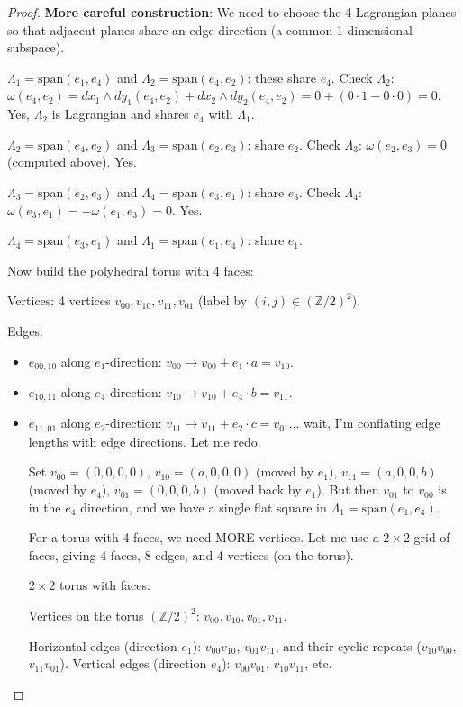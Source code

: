 \documentclass[12pt]{article}
\theoremstyle{definition}
\begin{document}
\begin{proof}
\textbf{More careful construction}: We need to choose the 4 Lagrangian planes so that adjacent planes share an edge direction (a common 1-dimensional subspace).

$\Lambda_1 = \mathrm{span}(e_1, e_4)$ and $\Lambda_2 = \mathrm{span}(e_4, e_2)$: these share $e_4$. Check $\Lambda_2$: $\omega(e_4,e_2) = dx_1\wedge dy_1(e_4,e_2)+dx_2\wedge dy_2(e_4,e_2) = 0+(0\cdot 1-0\cdot 0) = 0$. Yes, $\Lambda_2$ is Lagrangian and shares $e_4$ with $\Lambda_1$.

$\Lambda_2 = \mathrm{span}(e_4, e_2)$ and $\Lambda_3 = \mathrm{span}(e_2, e_3)$: share $e_2$. Check $\Lambda_3$: $\omega(e_2,e_3) = 0$ (computed above). Yes.

$\Lambda_3 = \mathrm{span}(e_2, e_3)$ and $\Lambda_4 = \mathrm{span}(e_3, e_1)$: share $e_3$. Check $\Lambda_4$: $\omega(e_3,e_1) = -\omega(e_1,e_3) = 0$. Yes.

$\Lambda_4 = \mathrm{span}(e_3, e_1)$ and $\Lambda_1 = \mathrm{span}(e_1, e_4)$: share $e_1$.

Now build the polyhedral torus with 4 faces:

Vertices: 4 vertices $v_{00}, v_{10}, v_{11}, v_{01}$ (label by $(i,j)\in(\mathbb{Z}/2)^2$).

Edges:
\begin{itemize}
\item $e_{00,10}$ along $e_1$-direction: $v_{00}\to v_{00}+e_1\cdot a = v_{10}$.
\item $e_{10,11}$ along $e_4$-direction: $v_{10}\to v_{10}+e_4\cdot b = v_{11}$.
\item $e_{11,01}$ along $e_2$-direction: $v_{11}\to v_{11}+e_2\cdot c = v_{01}$... wait, I'm conflating edge lengths with edge directions. Let me redo.

Set $v_{00} = (0,0,0,0)$, $v_{10} = (a,0,0,0)$ (moved by $e_1$), $v_{11} = (a,0,0,b)$ (moved by $e_4$), $v_{01} = (0,0,0,b)$ (moved back by $e_1$). But then $v_{01}$ to $v_{00}$ is in the $e_4$ direction, and we have a single flat square in $\Lambda_1 = \mathrm{span}(e_1,e_4)$.

For a torus with 4 faces, we need MORE vertices. Let me use a $2\times 2$ grid of faces, giving 4 faces, 8 edges, and 4 vertices (on the torus).

$2\times 2$ torus with faces:

Vertices on the torus $(\mathbb{Z}/2)^2$: $v_{00}, v_{10}, v_{01}, v_{11}$.

Horizontal edges (direction $e_1$): $v_{00}v_{10}$, $v_{01}v_{11}$, and their cyclic repeats ($v_{10}v_{00}$, $v_{11}v_{01}$).
Vertical edges (direction $e_4$): $v_{00}v_{01}$, $v_{10}v_{11}$, etc.


\end{itemize}
\end{proof}
\end{document}
